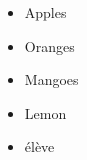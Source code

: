 \documentclass{article}
\begin{document}
\begin{itemize}
  \item Apples
  \item Oranges
  \item Mangoes
  \item Lemon
  \item élève
\end{itemize}
\end{document}
